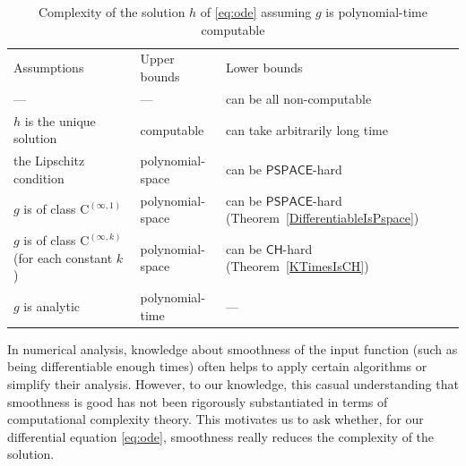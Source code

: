 \documentclass[12pt,a4paper]{article}
\theoremstyle{definition}
\theoremstyle{remark}
\newcommand{\classPSPACE}{\mathsf{PSPACE}}
\newcommand{\classCH}{\mathsf{CH}}
\newcommand{\classC}{\mathrm C}
\begin{document}
\begin{table}
\renewcommand\arraystretch{1.3}
\begin{center}
 \caption{Complexity of the solution $h$ of \eqref{eq:ode}
 assuming $g$ is polynomial-time computable}
 \label{table:related}
\small\vspace{3pt}
 \begin{tabular}{lll}
  Assumptions & Upper bounds & Lower bounds \\
  \noalign{\smallskip}
  \hline
  \noalign{\smallskip}
   --- & --- & can be all non-computable \cite{pour1979computable} \\
  $h$ is the unique solution & computable \cite{coddington1955theory}
  & \parbox[t]{14em}{can take arbitrarily long time\\\cite{ko1983computational,miller1970recursive}} \\
  the Lipschitz condition  & polynomial-space \cite{ko1983computational}
      &	can be $\classPSPACE$-hard \cite{kawamura2010lipschitz}\\
  $g$ is of class $\classC ^{(\infty, 1)}$ & polynomial-space 
      & \parbox[t]{14em}{can be $\classPSPACE$-hard\\(Theorem~\ref{DifferentiableIsPspace})} \\
  \parbox[t]{10.55em}{$g$ is of class $\classC ^{(\infty, k)}$\\{}(for each constant $k$)}
  & polynomial-space 
  & can be $\classCH$-hard (Theorem~\ref{KTimesIsCH}) \\
  $g$ is analytic
  & polynomial-time \cite{muller1987uniform,ko1988computing,kawamura2010complexity} 
  & ---
 \end{tabular}
\end{center}
\end{table}

In numerical analysis, 
knowledge about smoothness of the input function 
(such as being differentiable enough times) 
often helps
to apply certain algorithms or simplify their analysis.
However, 
to our knowledge, 
this casual understanding that smoothness is good 
has not been rigorously substantiated 
in terms of computational complexity theory. 
This motivates us to ask whether, 
for our differential equation \eqref{eq:ode}, 
smoothness really reduces the complexity of the solution. 
\end{document}
